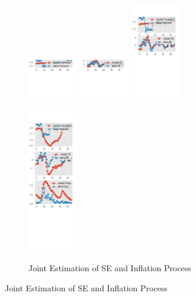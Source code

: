 \documentclass[]{article}
\begin{document}
\begin{figure}[ht]
\begin{subfigure}[b]{\textwidth}
	\end{subfigure}
	\vspace{1em}
	\vfill
	\begin{subfigure}[b]{\textwidth}
		\centering
		\caption{Joint Estimation of SE and Inflation Process}
		\label{SE_diag_joint_SPF}
	\includegraphics[width=0.24\textwidth]{figures/spf_se_est_joint_diag0.png}
	\includegraphics[width=0.24\textwidth]{figures/spf_se_est_joint_diag1.png}
	\includegraphics[width=0.24\textwidth]{figures/spf_se_est_joint_diag2.png}
	\includegraphics[width=0.24\textwidth]{figures/spf_se_est_joint_diag3.png}

\end{subfigure}
\end{figure}
\end{document}
